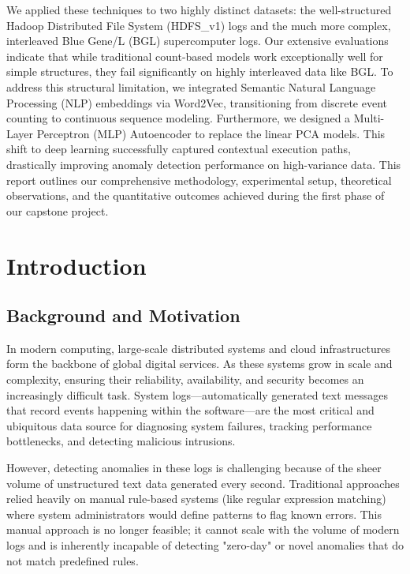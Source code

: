 \documentclass[12pt]{article}
\begin{document}
We applied these techniques to two highly distinct datasets: the well-structured Hadoop Distributed File System (HDFS\_v1) logs and the much more complex, interleaved Blue Gene/L (BGL) supercomputer logs. Our extensive evaluations indicate that while traditional count-based models work exceptionally well for simple structures, they fail significantly on highly interleaved data like BGL. To address this structural limitation, we integrated Semantic Natural Language Processing (NLP) embeddings via Word2Vec, transitioning from discrete event counting to continuous sequence modeling. Furthermore, we designed a Multi-Layer Perceptron (MLP) Autoencoder to replace the linear PCA models. This shift to deep learning successfully captured contextual execution paths, drastically improving anomaly detection performance on high-variance data. This report outlines our comprehensive methodology, experimental setup, theoretical observations, and the quantitative outcomes achieved during the first phase of our capstone project.

\section{Introduction}

\subsection{Background and Motivation}
In modern computing, large-scale distributed systems and cloud infrastructures form the backbone of global digital services. As these systems grow in scale and complexity, ensuring their reliability, availability, and security becomes an increasingly difficult task. System logs---automatically generated text messages that record events happening within the software---are the most critical and ubiquitous data source for diagnosing system failures, tracking performance bottlenecks, and detecting malicious intrusions. 

However, detecting anomalies in these logs is challenging because of the sheer volume of unstructured text data generated every second. Traditional approaches relied heavily on manual rule-based systems (like regular expression matching) where system administrators would define patterns to flag known errors. This manual approach is no longer feasible; it cannot scale with the volume of modern logs and is inherently incapable of detecting "zero-day" or novel anomalies that do not match predefined rules. 
\end{document}
